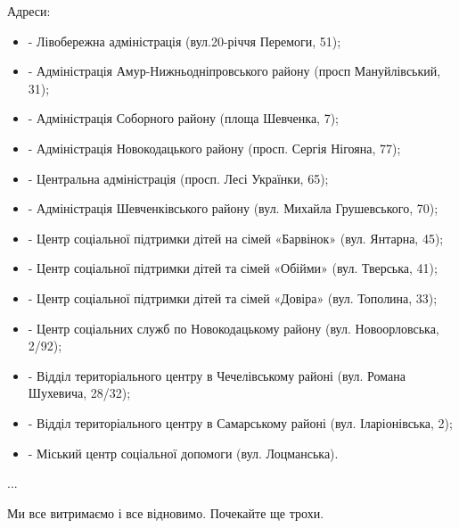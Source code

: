 Адреси:

\begin{itemize}
  \item - Лівобережна адміністрація (вул.20-річчя Перемоги, 51);
  \item - Адміністрація Амур-Нижньодніпровського району (просп Мануйлівський, 31);
  \item - Адміністрація Соборного району (площа Шевченка, 7);
  \item - Адміністрація Новокодацького району (просп. Сергія Нігояна, 77);
  \item - Центральна адміністрація (просп. Лесі Українки, 65);
  \item - Адміністрація Шевченківського району (вул. Михайла Грушевського, 70);
  \item - Центр соціальної підтримки дітей на сімей «Барвінок» (вул. Янтарна, 45);
  \item - Центр соціальної підтримки дітей та сімей «Обійми» (вул. Тверська, 41);
  \item - Центр соціальної підтримки дітей та сімей «Довіра» (вул. Тополина, 33);
  \item - Центр соціальних служб по Новокодацькому району (вул. Новоорловська, 2/92);
  \item - Відділ територіального центру в Чечелівському районі (вул. Романа Шухевича, 28/32);
  \item - Відділ територіального центру в Самарському районі (вул. Іларіонівська, 2);
  \item - Міський центр соціальної допомоги (вул. Лоцманська).
\end{itemize}
...

Ми все витримаємо і все відновимо. Почекайте ще трохи.

